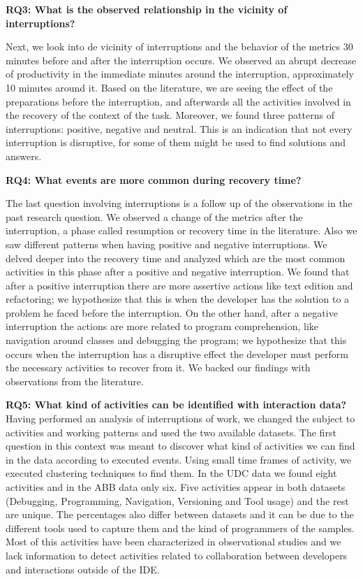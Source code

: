 \textbf{RQ3: What is the observed relationship in the vicinity of interruptions?}

Next, we look into de vicinity of interruptions and the behavior of the metrics 30 minutes before and after the interruption occurs. We observed an abrupt decrease of productivity in the immediate minutes around the interruption, approximately 10 minutes around it. Based on the literature, we are seeing the effect of the preparations before the interruption, and afterwards all the activities involved in the recovery of the context of the task. Moreover, we found three patterns of interruptions: positive, negative and neutral. This is an indication that not every interruption is disruptive, for some of them might be used to find solutions and answers.

\textbf{RQ4: What events are more common during recovery time?}

The last question involving interruptions is a follow up of the observations in the past research question. We observed a change of the metrics after the interruption, a phase called resumption or recovery time in the literature. Also we saw different patterns when having positive and negative interruptions. We delved deeper into the recovery time and analyzed which are the most common activities in this phase after a positive and negative interruption. We found that after a positive interruption there are more assertive actions like text edition and refactoring; we hypothesize that this is when the developer has the solution to a problem he faced before the interruption. On the other hand, after a negative interruption the actions are more related to program comprehension, like navigation around classes and debugging the program; we hypothesize that this occurs when the interruption has a disruptive effect the developer must perform the necessary activities to recover from it. We backed our findings with observations from the literature.

\textbf{RQ5: What kind of activities can be identified with interaction data?}
Having performed an analysis of interruptions of work, we changed the subject to activities and working patterns and used the two available datasets. The first question in this context was meant to discover what kind of activities we can find in the data according to executed events. Using small time frames of activity, we executed clustering techniques to find them. In the UDC data we found eight activities and in the ABB data only six. Five activities appear in both datasets (Debugging, Programming, Navigation, Versioning and Tool usage) and the rest are unique. The percentages also differ between datasets and it can be due to the different tools used to capture them and the kind of programmers of the samples. Most of this activities have been characterized in observational studies and we lack information to detect activities related to collaboration between developers and interactions outside of the IDE.

